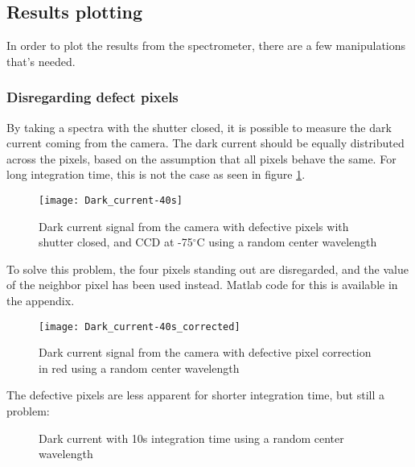 \subsection{Results plotting}

In order to plot the results from the spectrometer, there are a few manipulations that's needed.

\subsubsection{Disregarding defect pixels}

By taking a spectra with the shutter closed, it is possible to measure the dark current coming from the camera. The dark current should be equally distributed across the pixels, based on the assumption that all pixels behave the same. For long integration time, this is not the case as seen in figure \ref{fig:dark_current_40s}.

\begin{figure}[H]
\centering
\texttt{[image: Dark\_current-40s]}
\caption[Defective pixels]{Dark current signal from the camera with defective pixels with shutter closed, and CCD at -75$^\circ$C using a random center wavelength}%
\label{fig:dark_current_40s}%
\end{figure}

To solve this problem, the four pixels standing out are disregarded, and the value of the neighbor pixel has been used instead. Matlab code for this is available in the appendix. 

\begin{figure}[H]
\centering
\texttt{[image: Dark\_current-40s\_corrected]}
\caption[Defective pixels corrected]{Dark current signal from the camera with defective pixel correction in red using a random center wavelength}%
\label{fig:dark_current_40s-corrected}%
\end{figure}

The defective pixels are less apparent for shorter integration time, but still a problem:

\begin{figure}[H]
\centering
{}
\label{fig:dark_current_correction_10s-parentfig}
\caption[Dark current with 10s integration time]{Dark current with 10s integration time using a random center wavelength}
\end{figure}


